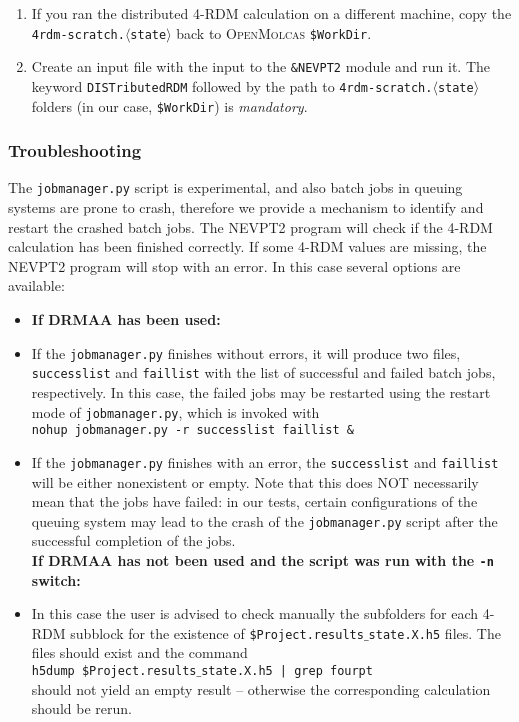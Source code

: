 \documentclass[bibliography=totoc,12pt,a4paper]{scrartcl}
\newcommand{\mol}{\textsc{OpenMolcas}}
\newcommand{\kwd}[1]{\texttt{#1}}
\begin{document}
\begin{enumerate}
 \item If you ran the distributed 4-RDM calculation on a different machine, copy the \kwd{4rdm-scratch.$\langle$state$\rangle$} back to \mol{} \kwd{\$WorkDir}.
 \item Create an input file with the input to the \kwd{\&NEVPT2} module and run it. The keyword \kwd{DISTributedRDM} followed by the path to \kwd{4rdm-scratch.$\langle$state$\rangle$} folders (in our case, \kwd{\$WorkDir}) is \emph{mandatory}.
\end{enumerate}

\subsubsection{Troubleshooting}

The \kwd{jobmanager.py} script is experimental, and also batch jobs in queuing systems are prone to crash, therefore we provide a mechanism to identify and restart the crashed batch jobs. The NEVPT2 program will check if the 4-RDM calculation has been finished correctly. If some 4-RDM values are missing, the NEVPT2 program will stop with an error. In this case several options are available:

\begin{itemize}
 \item[] \textbf{If DRMAA has been used:}
 \item If the \kwd{jobmanager.py} finishes without errors, it will produce two files, \kwd{successlist} and \kwd{faillist} with the list of successful and failed batch jobs, respectively. In this case, the failed jobs may be restarted using the restart mode of \kwd{jobmanager.py}, which is invoked with\\
 \kwd{nohup jobmanager.py -r successlist faillist \&}\label{item:jobm-restart}
 \item If the \kwd{jobmanager.py} finishes with an error, the \kwd{successlist} and \kwd{faillist} will be either nonexistent or empty. Note that this does NOT necessarily mean that the jobs have failed: in our tests, certain configurations of the queuing system may lead to the crash of the \kwd{jobmanager.py} script after the successful completion of the jobs.\\

 \textbf{If DRMAA has not been used and the script was run with the \texttt{-n} switch:}\\
 \item In this case the user is advised to check manually the subfolders for each 4-RDM subblock for the existence of \texttt{\$Project.results$\_$state.X.h5} files. The files should exist and the command\\
 \kwd{h5dump \$Project.results$\_$state.X.h5 | grep fourpt}\\
 should not yield an empty result -- otherwise the corresponding calculation should be rerun.

\end{itemize}
\end{document}
